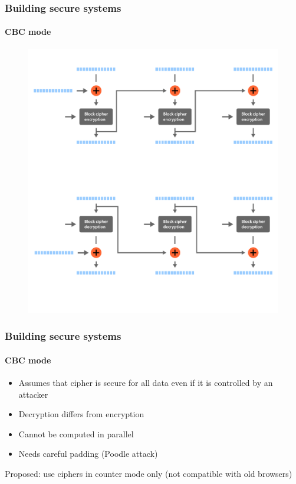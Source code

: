 \documentclass[12pt,t]{beamer}
\begin{document}
\begin{frame}[fragile]
\frametitle{Building secure systems}
\framesubtitle{CBC mode}
\begin{figure}[H]
\includegraphics[height=0.85\textheight]{cbc.pdf}
\end{figure}
\end{frame}

\begin{frame}
\frametitle{Building secure systems}
\framesubtitle{CBC mode}
\begin{itemize}
\item Assumes that cipher is secure for all data even if it is controlled by an attacker
\item Decryption differs from encryption
\item Cannot be computed in parallel
\item Needs careful padding (Poodle attack)
\end{itemize}
Proposed: use ciphers in counter mode only (not compatible with old browsers)
\end{frame}
\end{document}
